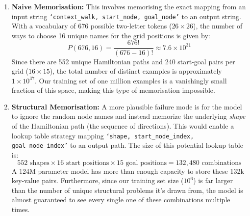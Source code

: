 \begin{enumerate}
    \item \textbf{Naive Memorisation:} This involves memorising the exact mapping from an input string \texttt{`context\_walk, start\_node, goal\_node'}  to an output string. With a vocabulary of 676 possible two-letter tokens ($26\times26$), the number of ways to choose 16 unique names for the grid positions is given by:
    \begin{equation}
        P(676, 16) = \frac{676!}{(676-16)!} \approx 7.6 \times 10^{31}
    \end{equation}
    Since there are 552 unique Hamiltonian paths and 240 start-goal pairs per grid ($16\times15$), the total number of distinct examples is approximately $1 \times 10^{37}$. Our training set of one million examples is a vanishingly small fraction of this space, making this type of memorisation impossible.

    \item \textbf{Structural Memorisation:} A more plausible failure mode is for the model to ignore the random node names and instead memorize the underlying \textit{shape} of the Hamiltonian path (the sequence of directions). This would enable a lookup table strategy mapping \texttt{`shape, start\_node\_index, goal\_node\_index'} to an output path. The size of this potential lookup table is:
    \begin{equation}
        552 \text{ shapes} \times 16 \text{ start positions} \times 15 \text{ goal positions} = 132{,}480 \text{ combinations}
    \end{equation}
    A 124M parameter model has more than enough capacity to store these 132k key-value pairs. Furthermore, since our training set size ($10^6$) is far larger than the number of unique structural problems it's drawn from, the model is almost guaranteed to see every single one of these combinations multiple times.
\end{enumerate}

